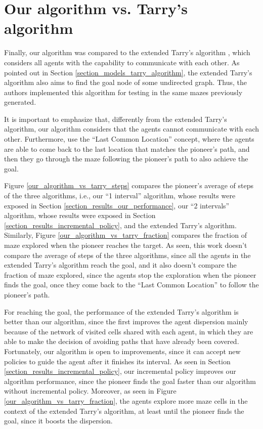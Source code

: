 \section{Our algorithm vs. Tarry's algorithm}
\label{section_results_tarry_vs_our}

Finally, our algorithm was compared to the extended Tarry's algorithm \cite{KivelevitchCohen2010}, which considers all agents with the capability to communicate with each other. As pointed out in Section \ref{section_models_tarry_algorithm}, the extended Tarry's algorithm also aims to find the goal node of some undirected graph. Thus, the authors implemented this algorithm for testing in the same mazes previously generated.

It is important to emphasize that, differently from the extended Tarry's algorithm, our algorithm considers that the agents cannot communicate with each other. Furthermore,  use the ``Last Common Location'' concept, where the agents are able to come back to the last location that matches the pioneer's path, and then they go through the maze following the pioneer's path to also achieve the goal.

Figure \ref{our_algorithm_vs_tarry_steps} compares the pioneer's average of steps of the three algorithms, i.e., our ``1 interval'' algorithm, whose results were exposed in Section \ref{section_results_our_performance}, our ``2 intervals'' algorithm, whose results were exposed in Section \ref{section_results_incremental_policy}, and the extended Tarry's algorithm. Similarly, Figure \ref{our_algorithm_vs_tarry_fraction} compares the fraction of maze explored when the pioneer reaches the target. As seen, this work doesn't compare the average of steps of the three algorithms, since all the agents in the extended Tarry's algorithm reach the goal, and it also doesn't compare the fraction of maze explored, since the agents stop the exploration when the pioneer finds the goal, once they come back to the ``Last Common Location'' to follow the pioneer's path.

For reaching the goal, the performance of the extended Tarry's algorithm is better than our algorithm, since the first improves the agent dispersion mainly because of the network of visited cells shared with each agent, in which they are able to make the decision of avoiding paths that have already been covered. Fortunately, our algorithm is open to improvements, since it can accept new policies to guide the agent after it finishes its interval. As seen in Section \ref{section_results_incremental_policy}, our incremental policy improves our algorithm performance, since the pioneer finds the goal faster than our algorithm without incremental policy. Moreover, as seen in Figure \ref{our_algorithm_vs_tarry_fraction}, the agents explore more maze cells in the context of the extended Tarry's algorithm, at least until the pioneer finds the goal, since it boosts the dispersion.

